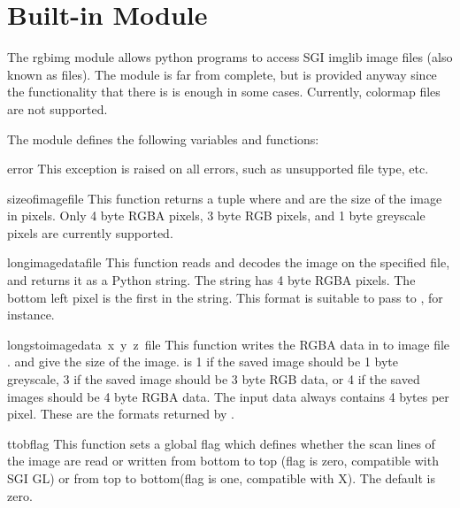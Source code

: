 \section{Built-in Module }
\label{module-rgbimg}

The rgbimg module allows python programs to access SGI imglib image
files (also known as  files).  The module is far from
complete, but is provided anyway since the functionality that there is
is enough in some cases.  Currently, colormap files are not supported.

The module defines the following variables and functions:

\begin{excdesc}{error}
This exception is raised on all errors, such as unsupported file type, etc.
\end{excdesc}

\begin{funcdesc}{sizeofimage}{file}
This function returns a tuple  where
 and  are the size of the image in pixels.
Only 4 byte RGBA pixels, 3 byte RGB pixels, and 1 byte greyscale pixels
are currently supported.
\end{funcdesc}

\begin{funcdesc}{longimagedata}{file}
This function reads and decodes the image on the specified file, and
returns it as a Python string. The string has 4 byte RGBA pixels.
The bottom left pixel is the first in
the string. This format is suitable to pass to ,
for instance.
\end{funcdesc}

\begin{funcdesc}{longstoimage}{data\, x\, y\, z\, file}
This function writes the RGBA data in  to image
file .  and  give the size of the image.
 is 1 if the saved image should be 1 byte greyscale, 3 if the
saved image should be 3 byte RGB data, or 4 if the saved images should
be 4 byte RGBA data.  The input data always contains 4 bytes per pixel.
These are the formats returned by .
\end{funcdesc}

\begin{funcdesc}{ttob}{flag}
This function sets a global flag which defines whether the scan lines
of the image are read or written from bottom to top (flag is zero,
compatible with SGI GL) or from top to bottom(flag is one,
compatible with X)\@.  The default is zero.
\end{funcdesc}
